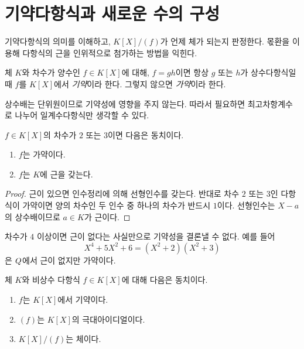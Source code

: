 \section{기약다항식과 새로운 수의 구성}
\label{sec:irreducible-quotients}

\begin{learninggoal}
기약다항식의 의미를 이해하고, $K[X]/(f)$가 언제 체가 되는지 판정한다. 몫환을 이용해 다항식의 근을 인위적으로 첨가하는 방법을 익힌다.
\end{learninggoal}

\begin{definition}
체 $K$와 차수가 양수인 $f\in K[X]$에 대해, $f=gh$이면 항상 $g$ 또는 $h$가 상수다항식일 때 $f$를 $K[X]$에서 \emph{기약}이라 한다. 그렇지 않으면 \emph{가약}이라 한다.
\end{definition}

상수배는 단위원이므로 기약성에 영향을 주지 않는다. 따라서 필요하면 최고차항계수로 나누어 일계수다항식만 생각할 수 있다.

\begin{proposition}[낮은 차수의 근 판정]
$f\in K[X]$의 차수가 $2$ 또는 $3$이면 다음은 동치이다.
\begin{enumerate}[label=(\roman*)]
  \item $f$는 가약이다.
  \item $f$는 $K$에 근을 갖는다.
\end{enumerate}
\end{proposition}

\begin{proof}
근이 있으면 인수정리에 의해 선형인수를 갖는다. 반대로 차수 $2$ 또는 $3$인 다항식이 가약이면 양의 차수인 두 인수 중 하나의 차수가 반드시 $1$이다. 선형인수는 $X-a$의 상수배이므로 $a\in K$가 근이다.
\end{proof}

\begin{pitfall}
차수가 $4$ 이상이면 근이 없다는 사실만으로 기약성을 결론낼 수 없다. 예를 들어
\[
  X^4+5X^2+6=(X^2+2)(X^2+3)
\]
은 $Q$에서 근이 없지만 가약이다.
\end{pitfall}

\begin{theorem}[기약성과 몫체]
체 $K$와 비상수 다항식 $f\in K[X]$에 대해 다음은 동치이다.
\begin{enumerate}[label=(\roman*)]
  \item $f$는 $K[X]$에서 기약이다.
  \item $(f)$는 $K[X]$의 극대아이디얼이다.
  \item $K[X]/(f)$는 체이다.
\end{enumerate}
\end{theorem}

